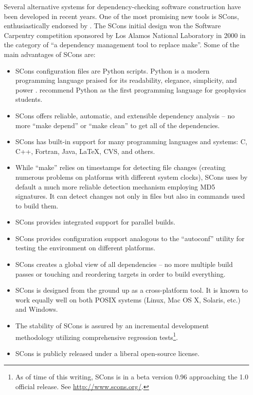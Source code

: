 Several alternative systems for dependency-checking software construction have
been developed in recent years. One of the most promising new tools is SCons,
enthusiastically endorsed by \cite{dubois}. The SCons initial design won the
Software Carpentry competition sponsored by Los Alamos National Laboratory in
2000 in the category of ``a dependency management tool to replace make''.
Some of the main advantages of SCons are:
\begin{itemize}
\item SCons configuration files are Python scripts. Python is a modern
  programming language praised for its readability, elegance, simplicity, and
  power \cite[]{python1,python2}. \cite{TLE21-03-02600267} recommend Python as
  the first programming language for geophysics students.
\item SCons offers reliable, automatic, and extensible dependency analysis --
  no more ``make depend'' or ``make clean'' to get all of the dependencies.
\item SCons has built-in support for many programming languages and systems: 
  C, C++, Fortran, Java, LaTeX, CVS, and others. 
\item While ``make'' relies on timestamps for detecting file changes (creating
  numerous problems on platforms with different system clocks), SCons
  uses by default a much more reliable detection mechanism employing MD5
  signatures. It can detect changes not only in files but also in commands
  used to build them.
\item SCons provides integrated support for parallel builds.
\item SCons provides configuration support analogous to the ``autoconf''
  utility for testing the environment on different platforms.
\item SCons creates a global view of all dependencies -- no more multiple
  build passes or touching and reordering targets in order to build
  everything.
\item SCons is designed from the ground up as a cross-platform tool. It is
  known to work equally well on both POSIX systems (Linux, Mac OS X, Solaris,
  etc.) and Windows.
\item The stability of SCons is assured by an incremental development
  methodology utilizing comprehensive regression tests\footnote{As of time of
    this writing, SCons is in a beta version 0.96 approaching the 1.0 official
    release. See \url{http://www.scons.org/}.}.
\item SCons is publicly released under a liberal open-source license.
\end{itemize}

